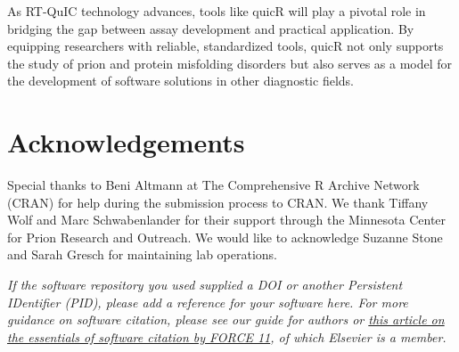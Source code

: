 \documentclass[preprint,12pt,a4paper]{elsarticle}
\begin{document}
        As RT-QuIC technology advances, tools like quicR will play a pivotal role in bridging the gap between assay development and practical application. By equipping researchers with reliable, standardized tools, quicR not only supports the study of prion and protein misfolding disorders but also serves as a model for the development of software solutions in other diagnostic fields.

    \section*{Acknowledgements}
        Special thanks to Beni Altmann at The Comprehensive R Archive Network (CRAN) for help during the submission process to CRAN. We thank Tiffany Wolf and Marc Schwabenlander for their support through the Minnesota Center for Prion Research and Outreach. We would like to acknowledge Suzanne Stone and Sarah Gresch for maintaining lab operations.




     
    

    \textit{If the software repository you used supplied a DOI or another
    Persistent IDentifier (PID), please add a reference for your software
    here. For more guidance on software citation, please see our guide for
    authors or \href{https://f1000research.com/articles/9-1257/v2}{this
      article on the essentials of software citation by FORCE 11}, of
    which Elsevier is a member.}
\end{document}
